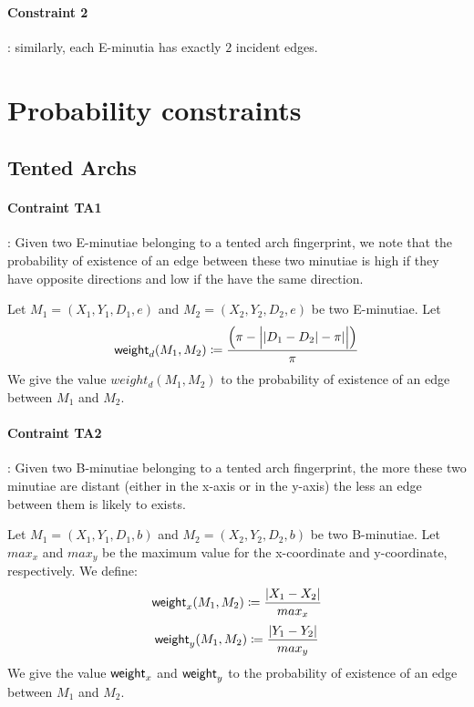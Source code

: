 \documentclass[8pt]{article}
\begin{document}
\paragraph{Constraint 2}:
similarly, each E-minutia has exactly $2$ incident edges.


\section{Probability constraints}
\subsection{Tented Archs}
\paragraph{Contraint TA1}:
Given two E-minutiae belonging to a tented arch fingerprint, we note that 
the probability of existence of an edge between these two minutiae 
is high if they have opposite directions and low if the have 
the same direction.

Let $M_1=(X_1,Y_1,D_1,e)$ and $M_2=(X_2,Y_2,D_2,e)$ be two E-minutiae.
Let 
  \begin{align*}
    \textsf{weight}_d(M_1,M_2) \coloneqq 
    \frac{
      \left( \pi - \Big\lvert \lvert D_1-D_2 \rvert - 
      \pi \rvert\Big\rvert \right)}{\pi}
  \end{align*} 
We give the value $weight_d(M_1,M_2)$ to the probability of existence of
an edge between $M_1$ and $M_2$.



\paragraph{Contraint TA2}:
Given two B-minutiae belonging to a tented arch fingerprint, the more
these two minutiae are distant (either in the x-axis or in the y-axis)
the less an edge between them is likely to exists.

Let $M_1=(X_1,Y_1,D_1,b)$ and $M_2=(X_2,Y_2,D_2,b)$ be two B-minutiae.
Let $max_x$ and $max_y$ be the maximum value for the x-coordinate and
y-coordinate, respectively. We define:
  \begin{align*}
    \textsf{weight}_x(M_1,M_2) \coloneqq
    \frac{\lvert X_1 - X_2 \rvert}{max_x}
  \end{align*}
  \begin{align*}
    \textsf{weight}_y(M_1,M_2) \coloneqq
    \frac{\lvert Y_1 - Y_2 \rvert}{max_y}
  \end{align*}
We give the value $\textsf{weight}_x$ and $\textsf{weight}_y$ to the probability 
of existence of an edge between $M_1$ and $M_2$.
\end{document}

